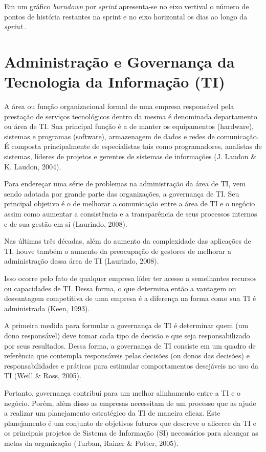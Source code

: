     Em um gráfico \textit{burndown} por \textit{sprint} apresenta-se no eixo vertival o número de pontos de história restantes na sprint e no eixo horizontal os dias ao longo da \textit{sprint} \cite{cohn06}.
    
  \section{Administração e Governança da Tecnologia da Informação (TI)}

    A área ou função organizacional formal de uma empresa responsável pela prestação de serviços tecnológicos dentro da mesma é denominada departamento ou área de TI. Sua principal função é a de manter os equipamentos (hardware), sistemas e programas (software), armazenagem de dados e redes de comunicação. É composta principalmente de especialistas tais como programadores, analistas de sistemas, líderes de projetos e gerentes de sistemas de informações (J. Laudon \& K. Laudon, 2004).

    Para endereçar uma série de problemas na administração da área de TI, vem sendo adotada por grande parte das organizações, a governança de TI. Seu principal objetivo é o de melhorar a comunicação entre a área de TI e o  negócio assim como aumentar a consistência e a transparência de seus processos internos e de sua gestão em si (Laurindo, 2008).

    Nas últimas três décadas, além do aumento da complexidade das aplicações de TI, houve também o aumento da preocupação de gestores de melhorar a administração dessa área de TI (Laurindo, 2008).

    Isso ocorre pelo fato de qualquer empresa líder ter acesso a semelhantes recursos ou capacidades de TI. Dessa forma, o que determina então a vantagem ou desvantagem competitiva de uma empresa é a diferença na forma como sua TI é administrada (Keen, 1993).

    A primeira medida para formular a governança de TI é determinar quem (um dono responsável) deve tomar cada tipo de decisão e que seja responsabilizado por seus resultados. Dessa forma, a governança de TI consiste em um quadro de referência que contempla responsáveis pelas decisões (ou donos das decisões) e responsabilidades e práticas para estimular comportamentos desejáveis no uso da TI (Weill \& Ross, 2005).

    Portanto, governança contribui para um melhor alinhamento entre a TI e o negócio. Porém, além disso as empresas necessitam de um processo que as ajude a realizar um planejamento estratégico da TI de maneira eficaz. Este planejamento é um conjunto de objetivos futuros que descreve o alicerce da TI e os principais projetos de Sistema de Informação (SI) necessários para alcançar as metas da organização (Turban, Rainer \& Potter, 2005).

